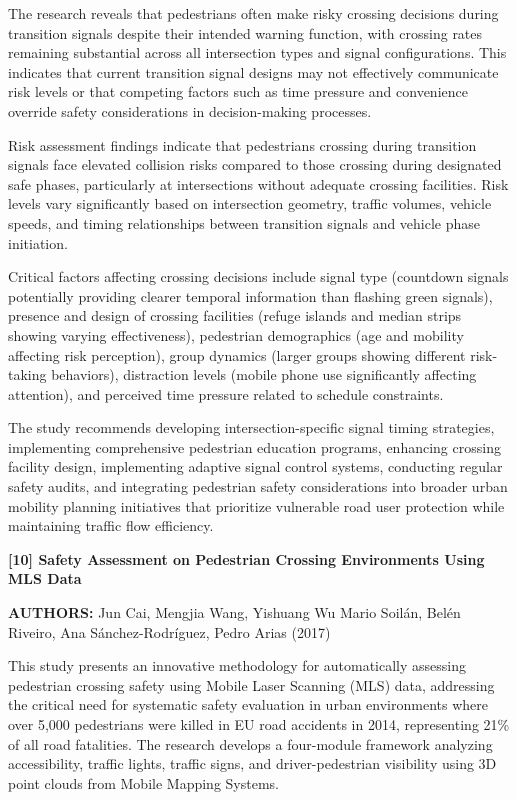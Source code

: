 \documentclass[a4paper, 12pt]{report}
\begin{document}
The research reveals that pedestrians often make risky crossing decisions during transition signals despite their intended warning function, with crossing rates remaining substantial across all intersection types and signal configurations. This indicates that current transition signal designs may not effectively communicate risk levels or that competing factors such as time pressure and convenience override safety considerations in decision-making processes.

Risk assessment findings indicate that pedestrians crossing during transition signals face elevated collision risks compared to those crossing during designated safe phases, particularly at intersections without adequate crossing facilities. Risk levels vary significantly based on intersection geometry, traffic volumes, vehicle speeds, and timing relationships between transition signals and vehicle phase initiation.

Critical factors affecting crossing decisions include signal type (countdown signals potentially providing clearer temporal information than flashing green signals), presence and design of crossing facilities (refuge islands and median strips showing varying effectiveness), pedestrian demographics (age and mobility affecting risk perception), group dynamics (larger groups showing different risk-taking behaviors), distraction levels (mobile phone use significantly affecting attention), and perceived time pressure related to schedule constraints.

The study recommends developing intersection-specific signal timing strategies, implementing comprehensive pedestrian education programs, enhancing crossing facility design, implementing adaptive signal control systems, conducting regular safety audits, and integrating pedestrian safety considerations into broader urban mobility planning initiatives that prioritize vulnerable road user protection while maintaining traffic flow efficiency.

\noindent \textbf{[10] Safety Assessment on Pedestrian Crossing Environments Using MLS Data}

\textbf{AUTHORS:} Jun Cai, Mengjia Wang, Yishuang Wu Mario Soilán, Belén Riveiro, Ana Sánchez-Rodríguez, Pedro Arias (2017)


This study presents an innovative methodology for automatically assessing pedestrian crossing safety using Mobile Laser Scanning (MLS) data, addressing the critical need for systematic safety evaluation in urban environments where over 5,000 pedestrians were killed in EU road accidents in 2014, representing 21\% of all road fatalities. The research develops a four-module framework analyzing accessibility, traffic lights, traffic signs, and driver-pedestrian visibility using 3D point clouds from Mobile Mapping Systems.
\end{document}
